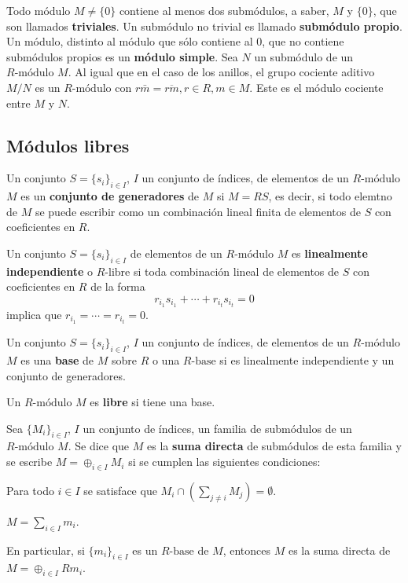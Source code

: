 Todo módulo $M \neq \{0\}$ contiene al menos dos submódulos, a saber, $M$ y $\{0\}$, que son llamados \textbf{triviales}. Un submódulo no trivial es llamado \textbf{submódulo propio}. Un módulo, distinto al módulo que sólo contiene al $0$, que no contiene submódulos propios es un  \textbf{módulo simple}. 
Sea $N$ un submódulo de un $R\mbox{-módulo}$ $M$. Al igual que en el caso de los anillos, el grupo cociente aditivo $M/N$ es un $R\mbox{-módulo}$ con $r\bar{m} = \overline{rm}, r\in R, m \in M$. Este es el módulo cociente entre $M$ y $N$. 

\subsection{Módulos libres}
\begin{definicion}
Un conjunto $S = \{ s_i\}_{i \in I}$, $I$  un conjunto de índices, de elementos de un $R\mbox{-módulo}$ $M$ es un \textbf{conjunto de generadores} de $M$ si $M = RS$, es decir, si todo elemtno de $M$ se puede escribir como un combinación lineal finita de elementos de $S$ con coeficientes en $R$.
\end{definicion}
\begin{definicion}
Un conjunto $S = \{ s_i\}_{i \in I}$ de elementos de un $R\mbox{-módulo}$ $M$ es  \textbf{linealmente independiente} o $R\mbox{-libre}$ si toda combinación lineal de elementos de $S$ con coeficientes en $R$ de la forma \[ r_{i_1}s_{i_1} + \cdots + r_{i_t}s_{i_t} = 0   \] implica que $r_{i_1} = \cdots = r_{i_t} = 0$. 
\end{definicion}
\begin{definicion}
Un conjunto $S = \{ s_i\}_{i \in I}$, $I$ un conjunto de índices, de elementos de un $R\mbox{-módulo}$ $M$ es una \textbf{base} de $M$ sobre $R$ o una \textbf{$R\mbox{-base}$} si es linealmente independiente y un conjunto de generadores. 
\end{definicion}
\begin{definicion}
Un $R\mbox{-módulo}$ $M$ es \textbf{libre} si tiene una base.
\end{definicion}
\begin{definicion}
Sea $\{M_i\}_{i \in I}$, $I$ un conjunto de índices,  un familia de submódulos de un $R\mbox{-módulo}$ $M$. Se dice que $M$ es la \textbf{suma directa} de submódulos de esta familia y se escribe $M = \oplus_{i \in I}M_i$ si se cumplen las siguientes condiciones:
\begin{bulletList}
\item Para todo $i \in I$ se satisface que $M_i \cap \left( \sum_{j \neq i} M_j \right) = \emptyset$.
\item $M = \sum_{i \in I}m_i$.
\end{bulletList}
En particular, si $\{ m_i \}_{i \in I}$ es un $R\mbox{-base}$ de $M$, entonces $M$ es la suma directa de $M = \oplus_{i \in I}Rm_i$.
\end{definicion}
